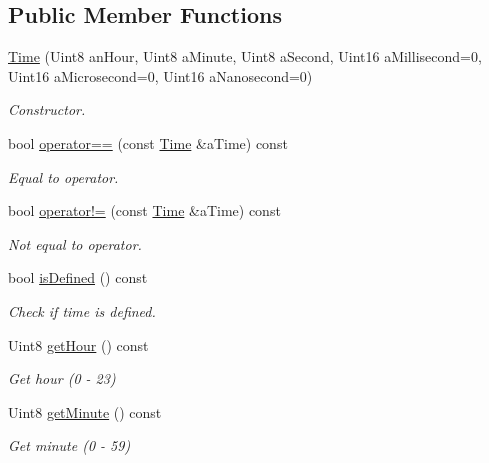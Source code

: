 \subsection*{Public Member Functions}
\begin{DoxyCompactItemize}
\item 
\hyperlink{classostk_1_1physics_1_1time_1_1_time_a9609e75d328ed240f6fc4529e26038cc}{Time} (Uint8 an\+Hour, Uint8 a\+Minute, Uint8 a\+Second, Uint16 a\+Millisecond=0, Uint16 a\+Microsecond=0, Uint16 a\+Nanosecond=0)
\begin{DoxyCompactList}\small\item\em Constructor. \end{DoxyCompactList}\item 
bool \hyperlink{classostk_1_1physics_1_1time_1_1_time_ad914e61c2ace9527236f88b897a0c6de}{operator==} (const \hyperlink{classostk_1_1physics_1_1time_1_1_time}{Time} \&a\+Time) const
\begin{DoxyCompactList}\small\item\em Equal to operator. \end{DoxyCompactList}\item 
bool \hyperlink{classostk_1_1physics_1_1time_1_1_time_a0e33fd17972bc71d52b159559f8180c8}{operator!=} (const \hyperlink{classostk_1_1physics_1_1time_1_1_time}{Time} \&a\+Time) const
\begin{DoxyCompactList}\small\item\em Not equal to operator. \end{DoxyCompactList}\item 
bool \hyperlink{classostk_1_1physics_1_1time_1_1_time_a25f4b6019bc558ca579aca4af8aa1ec0}{is\+Defined} () const
\begin{DoxyCompactList}\small\item\em Check if time is defined. \end{DoxyCompactList}\item 
Uint8 \hyperlink{classostk_1_1physics_1_1time_1_1_time_adc56fbb417453265e6d5a448e597fd76}{get\+Hour} () const
\begin{DoxyCompactList}\small\item\em Get hour (0 -\/ 23) \end{DoxyCompactList}\item 
Uint8 \hyperlink{classostk_1_1physics_1_1time_1_1_time_a19ccd8123a0d3e24b90bd1dc964d40ce}{get\+Minute} () const
\begin{DoxyCompactList}\small\item\em Get minute (0 -\/ 59) \end{DoxyCompactList}\item 

\end{DoxyCompactItemize}
